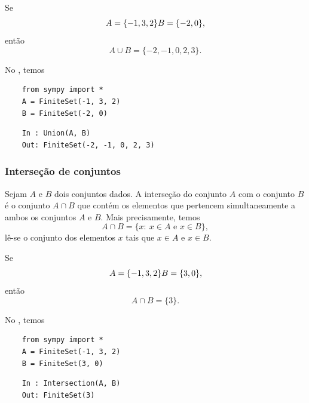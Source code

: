 \begin{ex}
  Se
  \begin{equation}
    A = \{-1, 3, 2\}\\
    B = \{-2, 0\},
  \end{equation}
  então
  \begin{equation}
    A\cup B = \{-2, -1, 0, 2, 3\}.
  \end{equation}

  \ifispython
  No \python, temos
  \begin{lstlisting}
    from sympy import *
    A = FiniteSet(-1, 3, 2)
    B = FiniteSet(-2, 0)
  \end{lstlisting}
  \begin{lstlisting}
    In : Union(A, B)
    Out: FiniteSet(-2, -1, 0, 2, 3)
  \end{lstlisting}
  \fi
\end{ex}

\subsubsection{Interseção de conjuntos}

Sejam $A$ e $B$ dois conjuntos dados. A interseção do conjunto $A$ com o conjunto $B$ é o conjunto $A\cap B$ que contém os elementos que pertencem simultaneamente a ambos os conjuntos $A$ e $B$. Mais precisamente, temos
\begin{equation}
  A\cap B = \{x:~x\in A \text{ e } x\in B\},
\end{equation}
lê-se o conjunto dos elementos $x$ tais que $x\in A$ e $x\in B$.

\begin{ex}
  Se
  \begin{equation}
    A = \{-1, 3, 2\}\\
    B = \{3, 0\},
  \end{equation}
  então
  \begin{equation}
    A\cap B = \{3\}.
  \end{equation}

  \ifispython
  No \python, temos
  \begin{lstlisting}
    from sympy import *
    A = FiniteSet(-1, 3, 2)
    B = FiniteSet(3, 0)
  \end{lstlisting}
  \begin{lstlisting}
    In : Intersection(A, B)
    Out: FiniteSet(3)
  \end{lstlisting}
  \fi
\end{ex}

